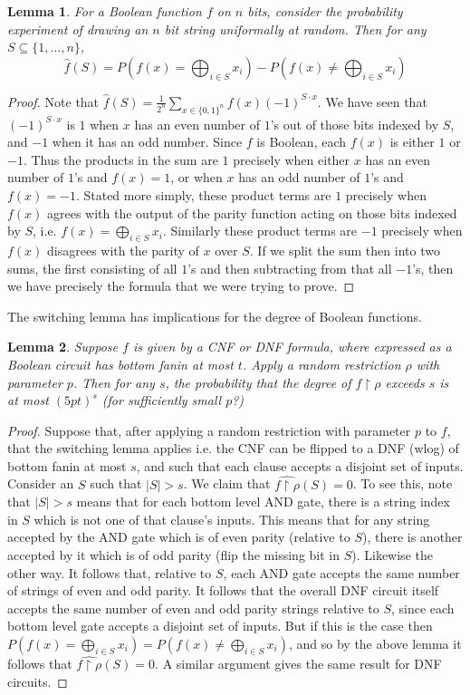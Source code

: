 \documentclass{article}
\theoremstyle{definition}
\theoremstyle{plain}
\theoremstyle{theorem}
\newtheorem{lemma}{Lemma}[section]
\begin{document}
\begin{lemma}
	For a Boolean function $f$ on $n$ bits, consider the probability experiment of drawing an $n$ bit string uniformally at random. Then for any $S \subseteq \{1,\ldots,n\}$,
	\[ \hat{f}(S) = P\left(f(x) = \bigoplus_{i \in S} x_i \right) - P\left(f(x) \neq \bigoplus_{i \in S} x_i \right) \]
\end{lemma}
\begin{proof}
	Note that $\hat{f}(S) = \frac{1}{2^n}\sum_{x \in \{0,1\}^n} f(x)(-1)^{S \cdot x}$. We have seen that $(-1)^{S \cdot x}$ is $1$ when $x$ has an even number of $1$'s out of those bits indexed by $S$, and $-1$ when it has an odd number. Since $f$ is Boolean, each $f(x)$ is either $1$ or $-1$. Thus the products in the sum are $1$ precisely when either $x$ has an even number of $1$'s and $f(x) = 1$, or when $x$ has an odd number of $1$'s and $f(x) = -1$. Stated more simply, these product terms are $1$ precisely when $f(x)$ agrees with the output of the parity function acting on those bits indexed by $S$, i.e. $f(x) = \bigoplus_{i \in S} x_i$. Similarly these product terms are $-1$ precisely when $f(x)$ disagrees with the parity of $x$ over $S$. If we split the sum then into two sums, the first consisting of all $1$'s and then subtracting from that all $-1$'s, then we have precisely the formula that we were trying to prove. 
\end{proof}
The switching lemma has implications for the degree of Boolean functions. 
\begin{lemma}
	Suppose $f$ is given by a CNF or DNF formula, where expressed as a Boolean circuit has bottom fanin at most $t$. Apply a random restriction $\rho$ with parameter $p$. Then for any $s$, the probability that the degree of $f\restriction \rho$ exceeds $s$ is at most $(5pt)^s$ (for sufficiently small $p$?)
\end{lemma}
\begin{proof}
	Suppose that, after applying a random restriction with parameter $p$ to $f$, that the switching lemma applies i.e. the CNF can be flipped to a DNF (wlog) of bottom fanin at most $s$, and such that each clause accepts a disjoint set of inputs. Consider an $S$ such that $|S| > s$. We claim that $\hat{f \restriction \rho}(S) = 0$. To see this, note that $|S| > s$ means that for each bottom level AND gate, there is a string index in $S$ which is not one of that clause's inputs. This means that for any string accepted by the AND gate which is of even parity (relative to $S$), there is another accepted by it which is of odd parity (flip the missing bit in $S$). Likewise the other way. It follows that, relative to $S$, each AND gate accepts the same number of strings of even and odd parity. It follows that the overall DNF circuit itself accepts the same number of even and odd parity strings relative to $S$, since each bottom level gate accepts a disjoint set of inputs. But if this is the case then $P\left(f(x) = \bigoplus_{i \in S} x_i \right) = P\left(f(x) \neq \bigoplus_{i \in S} x_i \right)$, and so by the above lemma it follows that $\hat{f\restriction \rho}(S) = 0$. A similar argument gives the same result for DNF circuits.
\end{proof}
\end{document}

